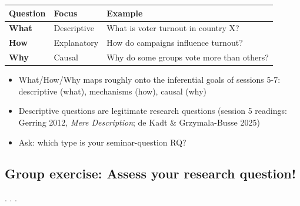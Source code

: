 \documentclass[
  letterpaper,
  DIV=11,
  numbers=noendperiod]{scrartcl}
\newcounter{none} %
\providecommand{\tightlist}{%
  \setlength{\itemsep}{0pt}\setlength{\parskip}{0pt}}
\begin{document}
{\def\LTcaptype{none} %
\begin{longtable}[]{@{}
  >{\raggedright\arraybackslash}p{}
  >{\raggedright\arraybackslash}p{}
  >{\raggedright\arraybackslash}p{}@{}}
\toprule\noalign{}
\begin{minipage}[b]{\linewidth}\raggedright
Question
\end{minipage} & \begin{minipage}[b]{\linewidth}\raggedright
Focus
\end{minipage} & \begin{minipage}[b]{\linewidth}\raggedright
Example
\end{minipage} \\
\midrule\noalign{}
\endhead
\bottomrule\noalign{}
\endlastfoot
\textbf{What} & Descriptive & What is voter turnout in country X? \\
\textbf{How} & Explanatory & How do campaigns influence turnout? \\
\textbf{Why} & Causal & Why do some groups vote more than others? \\
\end{longtable}
}

\begin{itemize}
\tightlist
\item
  What/How/Why maps roughly onto the inferential goals of sessions 5-7:
  descriptive (what), mechanisms (how), causal (why)
\item
  Descriptive questions are legitimate research questions (session 5
  readings: Gerring 2012, \emph{Mere Description}; de Kadt \&
  Grzymala-Busse 2025)
\item
  Ask: which type is your seminar-question RQ?
\end{itemize}

\subsection{Group exercise: Assess your research
question!}\label{group-exercise-assess-your-research-question}

. . .
\end{document}

